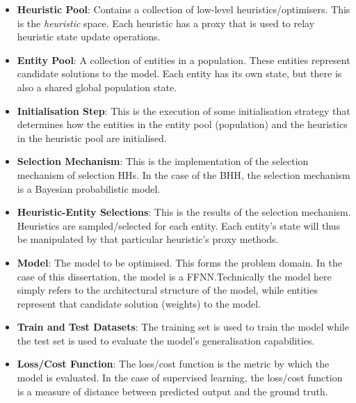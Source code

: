 \begin{itemize}
      \item \textbf{Heuristic Pool}: Contains a collection of low-level heuristics/optimisers. This is the \textit{heuristic} space. Each heuristic has a proxy that is used to relay heuristic state update operations.

      \item \textbf{Entity Pool}: A collection of entities in a population. These entities represent candidate solutions to the model. Each entity has its own state, but there is also a shared global population state.

      \item \textbf{Initialisation Step}: This is the execution of some initialisation strategy that determines how the entities in the entity pool (population) and the heuristics in the heuristic pool are initialised.

      \item \textbf{Selection Mechanism}: This is the implementation of the selection mechanism of selection \acp{HH}. In the case of the \ac{BHH}, the selection mechanism is a Bayesian probabilistic model.

      \item \textbf{Heuristic-Entity Selections}: This is the results of the selection mechanism. Heuristics are sampled/selected for each entity. Each entity's state will thus be manipulated by that particular heuristic's proxy methods.

      \item \textbf{Model}: The model to be optimised. This forms the problem domain. In the case of this dissertation, the model is a \ac{FFNN}.Technically the model here simply refers to the architectural structure of the model, while entities represent that candidate solution (weights) to the model.

      \item \textbf{Train and Test Datasets}: The training set is used to train the model while the test set is used to evaluate the model's generalisation capabilities.

      \item \textbf{Loss/Cost Function}: The loss/cost function is the metric  by which the model is evaluated. In the case of supervised learning, the loss/cost function is a measure of distance between predicted output and the ground truth.


\end{itemize}
